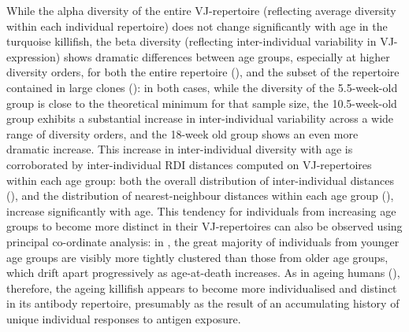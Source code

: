 While the alpha diversity of the entire VJ-repertoire (reflecting average diversity within each individual repertoire) does not change significantly with age in the turquoise killifish, the beta diversity (reflecting inter-individual variability in VJ-expression) shows dramatic differences between age groups, especially at higher diversity orders, for both the entire repertoire (), and the subset of the repertoire contained in large clones (): in both cases, while the diversity of the 5.5-week-old group is close to the theoretical minimum for that sample size, the 10.5-week-old group exhibits a substantial increase in inter-individual variability across a wide range of diversity orders, and the 18-week old group shows an even more dramatic increase. This increase in inter-individual diversity with age is corroborated by inter-individual RDI distances computed on VJ-repertoires within each age group: both the overall distribution of inter-individual distances (), and the distribution of nearest-neighbour distances within each age group (), increase significantly with age. This tendency for individuals from increasing age groups to become more distinct in their VJ-repertoires can also be observed using principal co-ordinate analysis:  in , the great majority of individuals from younger age groups are visibly more tightly clustered than those from older age groups, which drift apart progressively as age-at-death increases. As in ageing humans (), therefore, the ageing killifish appears to become more individualised and distinct in its antibody repertoire, presumably as the result of an accumulating history of unique individual responses to antigen exposure.

